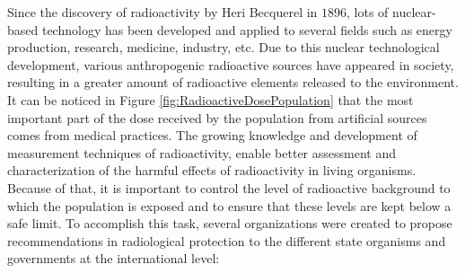 Since the discovery of radioactivity by Heri Becquerel in $1896$, lots of nuclear-based technology has been developed and applied to several fields such as energy production, research, medicine, industry, etc. Due to this nuclear technological development, various anthropogenic radioactive sources have appeared in society, resulting in a greater amount of radioactive elements released to the environment. It can be noticed in Figure \ref{fig:RadioactiveDosePopulation} that the most important part of the dose received by the population from artificial sources comes from medical practices. The growing knowledge and development of measurement techniques of radioactivity, enable better assessment and characterization of the harmful effects of radioactivity in living organisms. Because of that, it is important to control the level of radioactive background to which the population is exposed and to ensure that these levels are kept below a safe limit. To accomplish this task, several organizations were created to propose recommendations in radiological protection to the different state organisms and governments at the international level:


